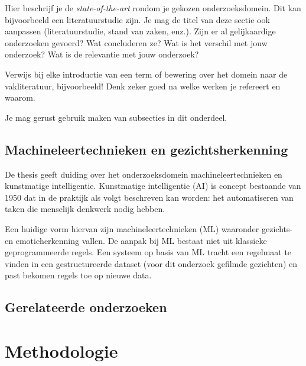 Hier beschrijf je de \emph{state-of-the-art} rondom je gekozen onderzoeksdomein. Dit kan bijvoorbeeld een literatuurstudie zijn. Je mag de titel van deze sectie ook aanpassen (literatuurstudie, stand van zaken, enz.). Zijn er al gelijkaardige onderzoeken gevoerd? Wat concluderen ze? Wat is het verschil met jouw onderzoek? Wat is de relevantie met jouw onderzoek?

Verwijs bij elke introductie van een term of bewering over het domein naar de vakliteratuur, bijvoorbeeld! Denk zeker goed na welke werken je refereert en waarom.


Je mag gerust gebruik maken van subsecties in dit onderdeel.

\subsection{Machineleertechnieken en gezichtsherkenning}
De thesis \textcite{Jonsson2018} geeft duiding over het onderzoeksdomein machineleertechnieken en kunstmatige intelligentie. Kunstmatige intelligentie (AI) is concept bestaande van 1950 dat in de praktijk als volgt beschreven kan worden: het automatiseren van taken die menselijk denkwerk nodig hebben. 

Een huidige vorm hiervan zijn machineleertechnieken (ML) waaronder gezichts- en emotieherkenning vallen. De aanpak bij ML bestaat niet uit klassieke geprogrammeerde regels. Een systeem op basis van ML tracht een regelmaat te vinden in een gestructureerde dataset (voor dit onderzoek gefilmde gezichten) en past bekomen regels toe op nieuwe data. 

\subsection{Gerelateerde onderzoeken}

\section{Methodologie}
\label{sec:methodologie}

